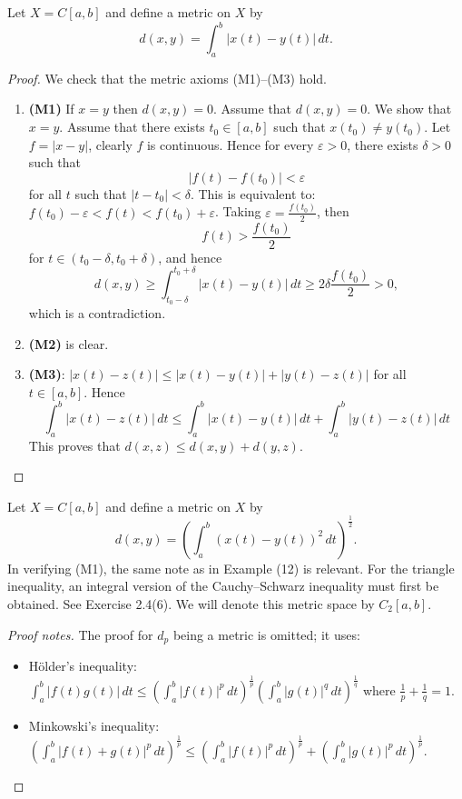 \begin{example}
Let \(X = C[a, b]\) and define a metric on \(X\) by
\[ d(x, y) = \int_a^b |x(t) - y(t)| \, dt. \]
\end{example}
\begin{proof}
We check that the metric axioms (M1)--(M3) hold.
\begin{enumerate}
 \item \textbf{(M1)} If \(x = y\) then \(d(x, y) = 0\).
Assume that \(d(x, y) = 0\). We show that \(x = y\).
Assume that there exists \(t_0 \in [a, b]\) such that \(x(t_0) \neq y(t_0)\).
Let \(f = |x - y|\), clearly \(f\) is continuous. Hence for every \(\varepsilon > 0\), there exists \(\delta > 0\) such that
\[ |f(t) - f(t_0)| < \varepsilon \]
for all \(t\) such that \(|t - t_0| < \delta\).
This is equivalent to: \(f(t_0) - \varepsilon < f(t) < f(t_0) + \varepsilon\).
Taking \(\varepsilon = \frac{f(t_0)}{2}\), then
\[ f(t) > \frac{f(t_0)}{2} \]
for \(t \in (t_0 - \delta, t_0 + \delta)\), and hence
\[ d(x, y) \geq \int_{t_0 - \delta}^{t_0 + \delta} |x(t) - y(t)| \, dt \geq 2\delta \frac{f(t_0)}{2} > 0, \]
which is a contradiction.

 \item \textbf{(M2)} is clear.

 \item \textbf{(M3)}: \( |x(t) - z(t)| \leq |x(t) - y(t)| + |y(t) - z(t)| \) for all \(t \in [a, b]\).
Hence
\[ \int_a^b |x(t) - z(t)|\,dt \leq \int_a^b |x(t) - y(t)|\,dt + \int_a^b |y(t) - z(t)|\,dt \]
This proves that \(d(x, z) \leq d(x, y) + d(y, z)\).
\end{enumerate}
\end{proof}


\begin{example}
Let \(X = C[a, b]\) and define a metric on \(X\) by
\[ d(x, y) = \left(\int_a^b (x(t) - y(t))^2 \, dt\right)^{\frac{1}{2}}. \]
In verifying (M1), the same note as in Example (12) is relevant. For the triangle inequality, an integral version of the Cauchy--Schwarz inequality must first be obtained. See Exercise 2.4(6). We will denote this metric space by \(C_2[a, b]\).
\end{example}
\begin{proof}[Proof notes]
The proof for \(d_p\) being a metric is omitted; it uses:
\begin{itemize}
  \item H\"older's inequality: \(\int_a^b |f(t)g(t)|\,dt \leq \left(\int_a^b |f(t)|^p\,dt\right)^{\frac{1}{p}} \left(\int_a^b |g(t)|^q\,dt\right)^{\frac{1}{q}}\) where \(\frac{1}{p} + \frac{1}{q} = 1\).
  \item Minkowski's inequality: \(\left(\int_a^b |f(t) + g(t)|^p\,dt\right)^{\frac{1}{p}} \leq \left(\int_a^b |f(t)|^p\,dt\right)^{\frac{1}{p}} + \left(\int_a^b |g(t)|^p\,dt\right)^{\frac{1}{p}}\).
\end{itemize}
\end{proof}


